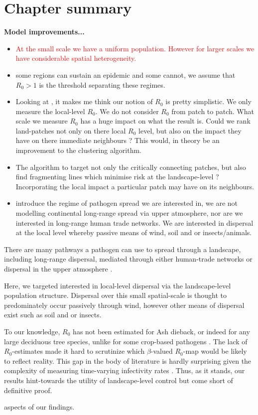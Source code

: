 \section{Chapter summary}

\textbf{Model improvements...}
\begin{itemize}
    \item \textcolor{red}{At the small scale we have a uniform population. However for larger scales we have considerable spatial heterogeneity.}
    \item some regions can sustain an epidemic and some cannot, we assume that $R_0>1$ is the threshold separating these regimes.
    \item Looking at \cite{R0-perc-ref}, it makes me think our notion of $R_0$ is pretty simplistic. We only measure the local-level $R_0$. We do not consider $R_0$ from patch to patch. What scale we measure $R_0$ has a huge impact on what the result is. Could we rank land-patches not only on there local $R_0$ level, but also on the impact they have on there immediate neighbours ? This would, in theory be an improvement to the clustering algorithm.
    \item The algorithm to target not only the critically connecting patches, but also find fragmenting lines which minimise risk at the landscape-level ? Incorporating the local impact a particular patch may have on its neighbours.
    \item introduce the regime of pathogen spread we are interested in, we are not modelling continental long-range spread via upper atmosphere, nor are we interested in long-range human trade networks. We are interested in dispersal at the local level whereby passive means of wind, soil and or insects/animals. 
\end{itemize}

There are many pathways a pathogen can use to spread through a landscape, including long-range dispersal, mediated through either human-trade networks %
\cite{hulme2009trade, banks2015role, chapman2017global} or dispersal in the upper atmosphere \cite{westbrook1999atmospheric, isard2005principles}.

Here, we targeted interested in local-level dispersal via the landscape-level population structure. Dispersal over this small spatial-scale is thought to predominately occur passively through wind, however other  means of dispersal exist such as soil and or insects.

To our knowledge, $R_0$ has not been estimated for Ash dieback, or indeed for any large deciduous tree species, unlike for some crop-based pathogens \cite{segarra2001epidemic}. The lack of $R_0$-estimates made it hard to scrutinize which $\beta$-valued $R_0$-map would be likely to reflect reality. This gap in the body of literature is hardly surprising given the complexity of measuring time-varying infectivity rates \cite{13-challenges}. Thus, as it stands, our results hint-towards the utility of landscape-level control but come short of definitive proof.

aspects of our findings. 


